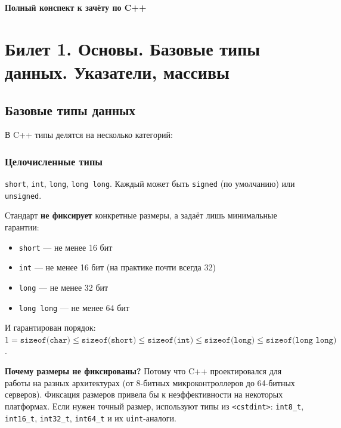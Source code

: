\documentclass[12pt,a4paper]{article}
\begin{document}
\begin{center}
{\LARGE\bfseries Полный конспект к зачёту по C++}
\end{center}

\tableofcontents
\setcounter{tocdepth}{3}
\newpage

\section{Билет 1. Основы. Базовые типы данных. Указатели, массивы}

\subsection{Базовые типы данных}

В C++ типы делятся на несколько категорий:

\subsubsection{Целочисленные типы}
\texttt{short}, \texttt{int}, \texttt{long}, \texttt{long long}. Каждый может быть \texttt{signed} (по умолчанию) или \texttt{unsigned}.

Стандарт \textbf{не фиксирует} конкретные размеры, а задаёт лишь минимальные гарантии:
\begin{itemize}
    \item \texttt{short} --- не менее 16 бит
    \item \texttt{int} --- не менее 16 бит (на практике почти всегда 32)
    \item \texttt{long} --- не менее 32 бит
    \item \texttt{long long} --- не менее 64 бит
\end{itemize}
И гарантирован порядок: $1 = \texttt{sizeof(char)} \le \texttt{sizeof(short)} \le \texttt{sizeof(int)} \le \texttt{sizeof(long)} \le \texttt{sizeof(long long)}$.

\textbf{Почему размеры не фиксированы?} Потому что C++ проектировался для работы на разных архитектурах (от 8-битных микроконтроллеров до 64-битных серверов). Фиксация размеров привела бы к неэффективности на некоторых платформах. Если нужен точный размер, используют типы из \texttt{<cstdint>}: \texttt{int8\_t}, \texttt{int16\_t}, \texttt{int32\_t}, \texttt{int64\_t} и их \texttt{uint}-аналоги.
\end{document}
